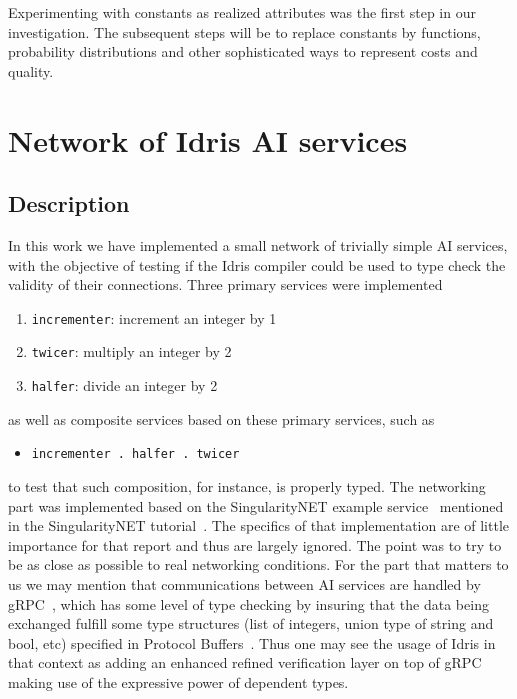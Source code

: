 \documentclass[]{report}
\begin{document}
Experimenting with constants as realized attributes was the first step
in our investigation.  The subsequent steps will be to replace
constants by functions, probability distributions and other
sophisticated ways to represent costs and quality.

\section{Network of Idris AI services}
\label{sec:network_idris_ai_services}

\subsection{Description}

In this work we have implemented a small network of trivially simple
AI services, with the objective of testing if the Idris compiler could
be used to type check the validity of their connections. Three primary
services were implemented
\begin{enumerate}
\item \texttt{incrementer}: increment an integer by 1
\item \texttt{twicer}: multiply an integer by 2
\item \texttt{halfer}: divide an integer by 2
\end{enumerate}
as well as composite services based on these primary services, such as
\begin{itemize}
\item \texttt{incrementer . halfer . twicer}
\end{itemize}
to test that such composition, for instance, is properly typed.  The
networking part was implemented based on the SingularityNET example
service~\cite{SNETExampleService} mentioned in the SingularityNET
tutorial~\cite{SNETTutorial}.  The specifics of that implementation
are of little importance for that report and thus are largely ignored.
The point was to try to be as close as possible to real networking
conditions.  For the part that matters to us we may mention that
communications between AI services are handled by gRPC~\cite{gRPC},
which has some level of type checking by insuring that the data being
exchanged fulfill some type structures (list of integers, union type
of string and bool, etc) specified in Protocol
Buffers~\cite{Protobuf}.  Thus one may see the usage of Idris in that
context as adding an enhanced refined verification layer on top of
gRPC making use of the expressive power of dependent types.
\end{document}
